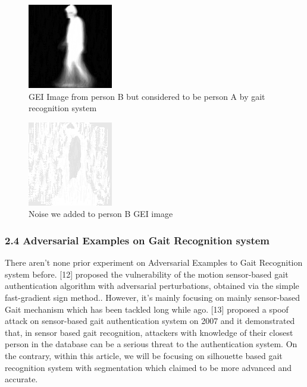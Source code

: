 \documentclass[letterpaper]{article} %
\begin{document}
 \begin{figure}
\centering
\includegraphics[width=0.6\columnwidth]{dl3.png} 
\caption{GEI Image from person B but considered to be person A by gait recognition system}
\label{fig4}
\end{figure}
\bigskip
 \begin{figure}
\centering
\includegraphics[width=0.6\columnwidth]{dlnoise.png} 
\caption{Noise we added to person B GEI image}
\label{fig5}
\end{figure}
\subsubsection{2.4 Adversarial Examples on Gait Recognition system}
There aren’t none prior experiment on Adversarial Examples to Gait Recognition system before. [12] proposed the vulnerability of the motion sensor-based gait authentication algorithm with adversarial perturbations, obtained via the simple fast-gradient sign method.. However, it’s mainly focusing on mainly sensor-based Gait mechanism which has been tackled long while ago. [13] proposed a spoof attack on sensor-based gait authentication system on 2007 and it demonstrated that, in sensor based gait recognition,  attackers with knowledge of their closest person in the database can be a serious threat to the authentication system. On the contrary, within this article, we will be focusing on silhouette based gait recognition system with segmentation which claimed to be more advanced and accurate.
\end{document}

